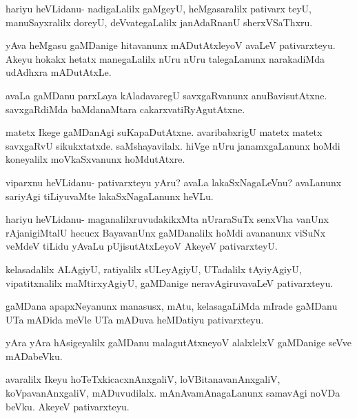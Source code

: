 \documentclass{article}
\begin{document}
\begin{mng}%
hariyu heVLidanu- nadigaLalilx gaMgeyU, heMgasaralilx pativarx
teyU, manuSayxralilx doreyU, deVvategaLalilx janAdaRnanU sherxVSaThxru.
\end{mng}

\begin{mng}%
yAva heMgasu gaMDanige hitavanunx mADutAtxleyoV avaLeV
pativarxteyu. Akeyu hokakx hetatx manegaLalilx nUru nUru talegaLanunx
narakadiMda udAdhxra mADutAtxLe.
\end{mng}

\begin{mng}%
avaLa gaMDanu parxLaya kAladavaregU savxgaRvanunx anuBavisutAtxne.
savxgaRdiMda baMdanaMtara cakarxvatiRyAgutAtxne.
\end{mng}

\begin{mng}%
matetx Ikege gaMDanAgi suKapaDutAtxne. avaribabxrigU matetx
matetx savxgaRvU sikukxtatxde. saMshayavilalx. hiVge nUru janamxgaLanunx hoMdi
koneyalilx moVkaSxvanunx hoMdutAtxre.
\end{mng}

\begin{mng}%
viparxnu heVLidanu- pativarxteyu yAru? avaLa lakaSxNagaLeVnu?
avaLanunx sariyAgi tiLiyuvaMte lakaSxNagaLanunx heVLu.
\end{mng}

\begin{mng}%
hariyu heVLidanu- maganalilxruvudakikxMta nUraraSuTx senxVha
vanUnx rAjanigiMtalU hecucx BayavanUnx gaMDanalilx hoMdi avananunx viSuNx
veMdeV tiLidu yAvaLu pUjisutAtxLeyoV AkeyeV pativarxteyU.
\end{mng}

\begin{mng}%
kelasadalilx ALAgiyU, ratiyalilx sULeyAgiyU, UTadalilx
tAyiyAgiyU, vipatitxnalilx maMtirxyAgiyU, gaMDanige neravAgiruvavaLeV
pativarxteyu.
\end{mng}

\begin{mng}%
gaMDana apapxNeyanunx manasusx, mAtu, kelasagaLiMda mIrade
gaMDanu UTa mADida meVle UTa mADuva heMDatiyu pativarxteyu.
\end{mng}

\begin{mng}%
yAra yAra hAsigeyalilx gaMDanu malagutAtxneyoV alalxlelxV
gaMDanige seVve mADabeVku.
\end{mng}

\begin{mng}%
avaralilx Ikeyu hoTeTxkicacxnAnxgaliV, loVBitanavanAnxgaliV,
koVpavanAnxgaliV, mADuvudilalx. mAnAvamAnagaLanunx samavAgi noVDa
beVku. AkeyeV pativarxteyu.
\end{mng}
\end{document}
